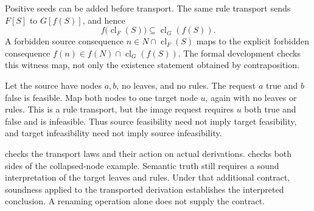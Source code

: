 Positive seeds can be added before transport. The same rule transport sends $F[S]$ to $G[f(S)]$, and hence
\[
 f\bigl(\operatorname{cl}_F(S)\bigr)
      \subseteq\operatorname{cl}_G(f(S)).
\]
A forbidden source consequence $n\in N\cap\operatorname{cl}_F(S)$ maps to the explicit forbidden consequence $f(n)\in f(N)\cap\operatorname{cl}_G(f(S))$. The formal development checks this witness map, not only the existence statement obtained by contraposition.

\begin{example}
\label{res:new:collapse}
Let the source have nodes $a,b$, no leaves, and no rules. The request $a$ true and $b$ false is feasible. Map both nodes to one target node $u$, again with no leaves or rules. This is a rule transport, but the image request requires $u$ both true and false and is infeasible. Thus source feasibility need not imply target feasibility, and target infeasibility need not imply source infeasibility.
\end{example}

 checks the transport laws and their action on actual derivations.  checks both sides of the collapsed-node example. Semantic truth still requires a sound interpretation of the target leaves and rules. Under that additional contract, soundness applied to the transported derivation establishes the interpreted conclusion. A renaming operation alone does not supply the contract.

